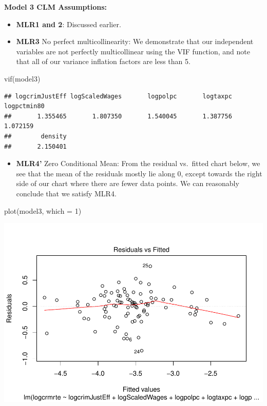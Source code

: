 \documentclass[]{article}
\newenvironment{Shaded}{}{}
\newcommand{\DataTypeTok}[1]{#1}
\newcommand{\DecValTok}[1]{#1}
\newcommand{\KeywordTok}[1]{\textcolor[rgb]{0.00,0.00,1.00}{#1}}
\newcommand{\NormalTok}[1]{#1}
\providecommand{\tightlist}{%
  \setlength{\itemsep}{0pt}\setlength{\parskip}{0pt}}
\begin{document}
\textbf{Model 3 CLM Assumptions:}

\begin{itemize}
\item
  \textbf{MLR1 and 2}: Discussed earlier.
\item
  \textbf{MLR3} No perfect multicollinearity: We demonstrate that our
  independent variables are not perfectly multicollinear using the VIF
  function, and note that all of our variance inflation factors are less
  than 5.
\end{itemize}

\begin{Shaded}
\begin{Highlighting}[]
\KeywordTok{vif}\NormalTok{(model3)}
\end{Highlighting}
\end{Shaded}

\begin{verbatim}
## logcrimJustEff logScaledWages       logpolpc       logtaxpc    logpctmin80 
##       1.355465       1.807350       1.540045       1.387756       1.072159 
##        density 
##       2.150401
\end{verbatim}

\begin{itemize}
\tightlist
\item
  \textbf{MLR4'} Zero Conditional Mean: From the residual vs.~fitted
  chart below, we see that the mean of the residuals mostly lie along 0,
  except towards the right side of our chart where there are fewer data
  points. We can reasonably conclude that we satisfy MLR4.
\end{itemize}

\begin{Shaded}
\begin{Highlighting}[]
\KeywordTok{plot}\NormalTok{(model3, }\DataTypeTok{which =} \DecValTok{1}\NormalTok{)}
\end{Highlighting}
\end{Shaded}

\includegraphics{Bagnard_Gaustad_Hartman_Leung_Lab_3_files/figure-latex/unnamed-chunk-86-1.pdf}
\end{document}
